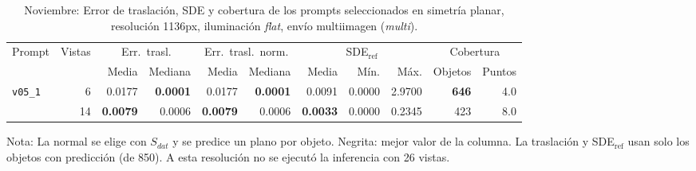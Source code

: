 \begin{table}[htbp]
\centering
\caption{Noviembre: Error de traslación, SDE y cobertura de los prompts seleccionados en simetría planar, resolución 1136px, iluminación \textit{flat}, envío multiimagen (\textit{multi}).}
\label{tab:nov_plane_1136_posicion}
\begin{lrbox}{\tablebox}
\begin{adjustbox}{max width=\textwidth}
\begin{tabular}{lrrrrrrrrrr}
\toprule
\multirow{2}{*}{Prompt} & \multirow{2}{*}{Vistas} & \multicolumn{2}{c}{Err.\ trasl.} & \multicolumn{2}{c}{Err.\ trasl.\ norm.} & \multicolumn{3}{c}{SDE$_{\mathrm{ref}}$} & \multicolumn{2}{c}{Cobertura} \\
\cmidrule(lr){3-4} \cmidrule(lr){5-6} \cmidrule(lr){7-9} \cmidrule(lr){10-11}
 &  & Media & Mediana & Media & Mediana & Media & Mín. & Máx. & Objetos & Puntos \\
\midrule
\multirow{2}{*}{\texttt{v05\_1}} & 6 & 0.0177 & \textbf{0.0001} & 0.0177 & \textbf{0.0001} & 0.0091 & 0.0000 & 2.9700 & \textbf{646} & 4.0 \\
 & 14 & \textbf{0.0079} & 0.0006 & \textbf{0.0079} & 0.0006 & \textbf{0.0033} & 0.0000 & 0.2345 & 423 & 8.0 \\
\bottomrule
\end{tabular}
\end{adjustbox}
\end{lrbox}
\usebox{\tablebox}

\vspace{1.5ex}
\begin{minipage}{\wd\tablebox}
\footnotesize
Nota: La normal se elige con $S_{dat}$ y se predice un plano por objeto. Negrita: mejor valor de la columna. La traslación y SDE$_{\mathrm{ref}}$ usan solo los objetos con predicción (de 850). A esta resolución no se ejecutó la inferencia con 26 vistas.
\end{minipage}
\end{table}

\clearpage

